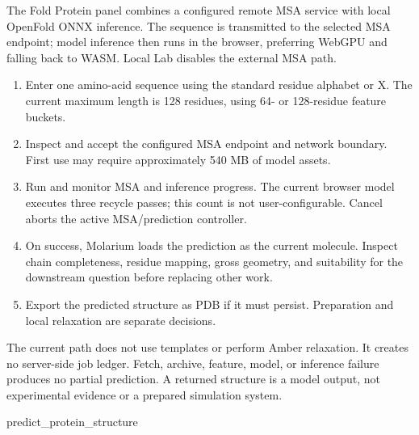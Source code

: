 The Fold Protein panel combines a configured remote MSA service with local OpenFold ONNX inference. The sequence is transmitted to the selected MSA endpoint; model inference then runs in the browser, preferring WebGPU and falling back to WASM. Local Lab disables the external MSA path.


\begin{enumerate}
\item Enter one amino-acid sequence using the standard residue alphabet or X. The current maximum length is 128 residues, using 64- or 128-residue feature buckets.
\item Inspect and accept the configured MSA endpoint and network boundary. First use may require approximately 540 MB of model assets.
\item Run and monitor MSA and inference progress. The current browser model executes three recycle passes; this count is not user-configurable. Cancel aborts the active MSA/prediction controller.
\item On success, Molarium loads the prediction as the current molecule. Inspect chain completeness, residue mapping, gross geometry, and suitability for the downstream question before replacing other work.
\item Export the predicted structure as PDB if it must persist. Preparation and local relaxation are separate decisions.
\end{enumerate}

The current path does not use templates or perform Amber relaxation. It creates no server-side job ledger. Fetch, archive, feature, model, or inference failure produces no partial prediction. A returned structure is a model output, not experimental evidence or a prepared simulation system.

\begin{skillcontract}{predict\_protein\_structure}
\end{skillcontract}

